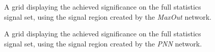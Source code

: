 \begin{figure}
    \caption{A grid displaying the achieved significance on the full statistics signal set, using the signal region 
    created by the \emph{MaxOut} network.}
    \label{fig:MaxOutPCA_FS_MLMGridSig}
\end{figure}

\begin{figure}
    \caption{A grid displaying the achieved significance on the full statistics signal set, using the signal region 
    created by the \emph{PNN} network.}
    \label{fig:PNNPCA_FS_MLMGridSig}
\end{figure}